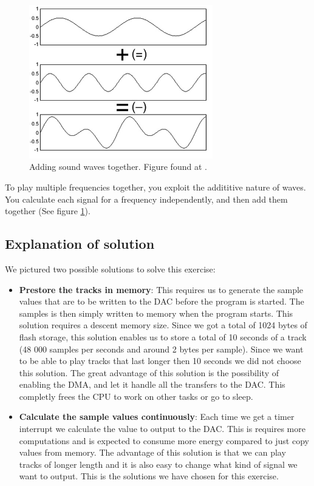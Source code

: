 \begin{figure}[h]
	\centering
	\includegraphics[width=8cm]{img/sumofsines.jpg}
	\caption{Adding sound waves together. Figure found at \cite{fourier}.}
	\label{fig:adding_waves}
\end{figure}
To play multiple frequencies together, you exploit the addititive nature of waves. You calculate each signal for a frequency independently, and then add them together (See figure \ref{fig:adding_waves}).

\subsection{Explanation of solution}
We pictured two possible solutions to solve this exercise:

\begin{itemize}
	\item \textbf{Prestore the tracks in memory}: This requires us to generate the sample values that are to be written to the DAC before the program is started. The samples is then simply written to memory when the program starts. This solution requires a descent memory size. Since we got a total of 1024 bytes of flash storage, this solution enables us to store a total of 10 seconds of a track (48 000 samples per seconds and around 2 bytes per sample). Since we want to be able to play tracks that last longer then 10 seconds we did not choose this solution. The great advantage of this solution is the possibility of enabling the DMA, and let it handle all the transfers to the DAC. This completly frees the CPU to work on other tasks or go to sleep.
	\item \textbf{Calculate the sample values continuously}: Each time we get a timer interrupt we calculate the value to output to the DAC. This is requires more computations and is expected to consume more energy compared to just copy values from memory. The advantage of this solution is that we can play tracks of longer length and it is also easy to change what kind of signal we want to output. This is the solutions we have chosen for this exercise.
	   
\end{itemize}

